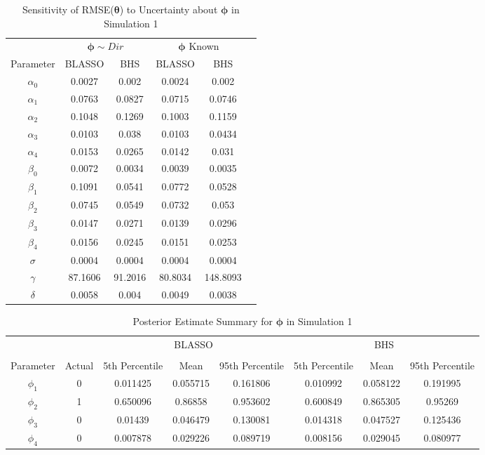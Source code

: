 \begin{table}[!h]
	\tiny
  \centering
  \caption{Sensitivity of RMSE($\bm{\theta}$) to Uncertainty about $\bm{\phi}$ in Simulation 1}
    \begin{tabular}{cccccc}
    \toprule
    & \multicolumn{2}{c}{$\bm{\phi} \sim Dir$} & \multicolumn{2}{c}{$\bm{\phi}$ Known}\\
    \cline{2-3} \cline{4-5}
     Parameter & BLASSO & BHS & BLASSO & BHS  \\
    \midrule
    $\alpha_0$    & 0.0027 & 0.002 & 0.0024 & 0.002 \\
  $\alpha_1$  & 0.0763 & 0.0827 & 0.0715 & 0.0746 \\
    $\alpha_2$ & 0.1048 & 0.1269 & 0.1003 & 0.1159 \\
    $\alpha_3$    & 0.0103 & 0.038 & 0.0103 & 0.0434 \\
    $\alpha_4$    & 0.0153 & 0.0265 & 0.0142 & 0.031 \\
   $\beta_0$ & 0.0072 & 0.0034 & 0.0039 & 0.0035 \\
    $\beta_1$  & 0.1091 & 0.0541 & 0.0772 & 0.0528 \\
    $\beta_2$   & 0.0745 & 0.0549 & 0.0732 & 0.053 \\
   $\beta_3$     & 0.0147 & 0.0271 & 0.0139 & 0.0296 \\
    $\beta_4$    & 0.0156 & 0.0245 & 0.0151 & 0.0253 \\
   $\sigma$ & 0.0004 & 0.0004 & 0.0004 & 0.0004 \\
    $\gamma$  & 87.1606 & 91.2016 & 80.8034 & 148.8093 \\
    $\delta$ & 0.0058 & 0.004 & 0.0049 & 0.0038 \\
    \bottomrule
    \end{tabular}%
  \label{tab:rmsedirichlet}%
\end{table}%


\begin{table}[!h]
	\tiny
  \centering
  \caption{Posterior Estimate Summary for $\bm{\phi}$ in Simulation 1}
    \begin{tabular}{cccccccc}
    \toprule
    & & \multicolumn{3}{c}{BLASSO} & \multicolumn{3}{c}{ BHS} \\
    \cline{3-5} \cline{6-8}\\
   Parameter & Actual & 5th Percentile   & Mean & 95th Percentile   & 5th Percentile   & Mean & 95th Percentile \\
    \midrule
    $\phi_1$    & 0    & 0.011425 & 0.055715 & 0.161806 & 0.010992 & 0.058122 & 0.191995 \\
    $\phi_2$    & 1    & 0.650096 & 0.86858 & 0.953602 & 0.600849 & 0.865305 & 0.95269 \\
   $\phi_3$    & 0    & 0.01439 & 0.046479 & 0.130081 & 0.014318 & 0.047527 & 0.125436 \\
   $\phi_4$    & 0    & 0.007878 & 0.029226 & 0.089719 & 0.008156 & 0.029045 & 0.080977 \\
    \bottomrule
    \end{tabular}%
  \label{tab:estdirichlet}%
\end{table}%


